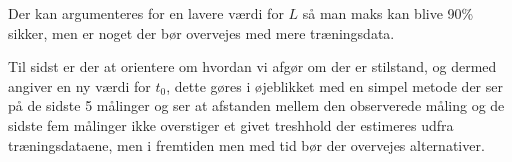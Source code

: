 Der kan argumenteres for en lavere værdi for $L$ så man maks kan blive 90\% sikker, men er noget der bør overvejes med mere træningsdata.

Til sidst er der at orientere om hvordan vi afgør om der er stilstand, og dermed angiver en ny værdi for $t_0$, dette gøres i øjeblikket med en simpel metode der ser på de sidste 5 målinger og ser at afstanden mellem den observerede måling og de sidste fem målinger ikke overstiger et givet treshhold der estimeres udfra træningsdataene, men i fremtiden men med tid bør der overvejes alternativer.
